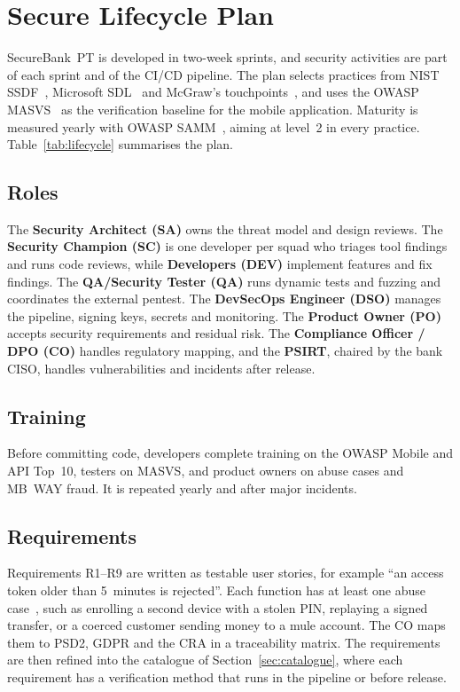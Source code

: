 \section{Secure Lifecycle Plan}
\label{sec:lifecycle}

SecureBank~PT is developed in two-week sprints, and security activities
are part of each sprint and of the \ac{CI/CD} pipeline. The plan selects practices from NIST \ac{SSDF}~\cite{nist800218},
Microsoft \ac{SDL}~\cite{mssdl} and McGraw's touchpoints~\cite{mcgraw2006},
and uses the OWASP \ac{MASVS}~\cite{masvs} as the verification baseline for
the mobile application. Maturity is measured yearly with OWASP \ac{SAMM}~\cite{samm}, aiming at
level~2 in every practice. Table~\ref{tab:lifecycle} summarises the plan.

\subsection{Roles}
The \textbf{Security Architect (SA)} owns the threat model and design
reviews. The \textbf{Security Champion (SC)} is one developer per squad
who triages tool findings and runs code reviews, while \textbf{Developers
(DEV)} implement features and fix findings. The \textbf{QA/Security Tester
(QA)} runs dynamic tests and fuzzing and coordinates the external pentest. The \textbf{DevSecOps Engineer (DSO)}
manages the pipeline, signing keys, secrets and monitoring. The
\textbf{Product Owner (PO)} accepts security requirements and residual
risk. The \textbf{Compliance Officer / DPO (CO)} handles regulatory
mapping, and the \textbf{\ac{PSIRT}}, chaired by the bank CISO, handles
vulnerabilities and incidents after release.

\subsection{Training}
Before committing code, developers complete training on the OWASP Mobile
and \ac{API} Top~10, testers on \ac{MASVS}, and product owners on abuse
cases and MB~WAY fraud. It is repeated yearly and after major incidents.

\subsection{Requirements}
Requirements R1--R9 are written as testable user stories, for example ``an
access token older than 5~minutes is rejected''. Each function has at
least one abuse case~\cite{mcgraw2006}, such as enrolling a second device
with a stolen \ac{PIN}, replaying a signed transfer, or a coerced customer
sending money to a mule account. The CO maps them to \ac{PSD2},
\ac{GDPR} and the \ac{CRA} in a traceability matrix. The requirements are
then refined into the catalogue of Section~\ref{sec:catalogue}, where each
requirement has a verification method that runs in the pipeline or
before release.

